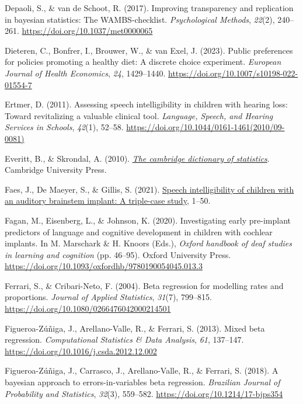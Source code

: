 \documentclass[
]{agujournal2019}
\newlength{\cslhangindent}
\newenvironment{CSLReferences}[2] %
 {\begin{list}{}{%
  \setlength{\itemindent}{0pt}
  \setlength{\leftmargin}{0pt}
  \setlength{\parsep}{0pt}
  \ifodd #1
   \setlength{\leftmargin}{\cslhangindent}
   \setlength{\itemindent}{-1\cslhangindent}
  \fi
  \setlength{\itemsep}{#2\baselineskip}}}
 {\end{list}}
\begin{document}
\begin{CSLReferences}{1}{0}
Depaoli, S., \& van de Schoot, R. (2017). Improving transparency and
replication in bayesian statistics: The WAMBS-checklist.
\emph{Psychological Methods}, \emph{22}(2), 240--261.
\url{https://doi.org/10.1037/met0000065}

Dieteren, C., Bonfrer, I., Brouwer, W., \& van Exel, J. (2023). Public
preferences for policies promoting a healthy diet: A discrete choice
experiment. \emph{European Journal of Health Economics}, \emph{24},
1429--1440. \url{https://doi.org/10.1007/s10198-022-01554-7}

Ertmer, D. (2011). Assessing speech intelligibility in children with
hearing loss: Toward revitalizing a valuable clinical tool.
\emph{Language, Speech, and Hearing Services in Schools}, \emph{42}(1),
52--58. \url{https://doi.org/10.1044/0161-1461(2010/09-0081)}

Everitt, B., \& Skrondal, A. (2010). \emph{\href{}{The cambridge
dictionary of statistics}}. Cambridge University Press.

Faes, J., De Maeyer, S., \& Gillis, S. (2021). \href{}{Speech
intelligibility of children with an auditory brainstem implant: A
triple-case study}, 1--50.

Fagan, M., Eisenberg, L., \& Johnson, K. (2020). Investigating early
pre-implant predictors of language and cognitive development in children
with cochlear implants. In M. Marschark \& H. Knoors (Eds.),
\emph{Oxford handbook of deaf studies in learning and cognition} (pp.
46--95). Oxford University Press.
\url{https://doi.org/10.1093/oxfordhb/9780190054045.013.3}

Ferrari, S., \& Cribari-Neto, F. (2004). Beta regression for modelling
rates and proportions. \emph{Journal of Applied Statistics},
\emph{31}(7), 799--815.
\url{https://doi.org/10.1080/0266476042000214501}

Figueroa-Zúñiga, J., Arellano-Valle, R., \& Ferrari, S. (2013). Mixed
beta regression. \emph{Computational Statistics \& Data Analysis},
\emph{61}, 137--147. \url{https://doi.org/10.1016/j.csda.2012.12.002}

Figueroa-Zúñiga, J., Carrasco, J., Arellano-Valle, R., \& Ferrari, S.
(2018). A bayesian approach to errors-in-variables beta regression.
\emph{Brazilian Journal of Probability and Statistics}, \emph{32}(3),
559--582. \url{https://doi.org/10.1214/17-bjps354}


\end{CSLReferences}
\end{document}
